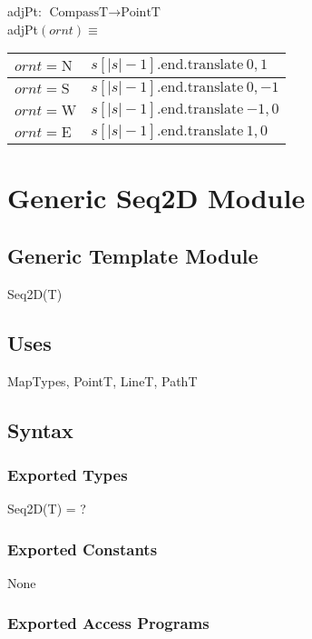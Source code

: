 \documentclass[12pt]{article}
\begin{document}
\noindent adjPt: $\mbox{CompassT} \rightarrow \mbox{PointT}$\\
adjPt$(ornt) \equiv$

\medskip

\begin{tabular}{|l|l|}
\hline
$ornt = \mbox{N}$ & $s[|s|-1].\mbox{end}.\mbox{translate}\ {0, 1}$\\
\hline
$ornt = \mbox{S}$ & $s[|s|-1].\mbox{end}.\mbox{translate}\ {0, -1}$\\
\hline
$ornt = \mbox{W}$ & $s[|s|-1].\mbox{end}.\mbox{translate}\ {-1, 0}$\\
\hline
$ornt = \mbox{E}$ & $s[|s|-1].\mbox{end}.\mbox{translate}\ {1, 0}$\\
\hline
\end{tabular}

\newpage

\section* {Generic Seq2D Module}

\subsection* {Generic Template Module}

Seq2D(T)

\subsection* {Uses}

MapTypes, PointT, LineT, PathT

\subsection* {Syntax}

\subsubsection* {Exported Types}

Seq2D(T) = ?

\subsubsection* {Exported Constants}

None

\subsubsection* {Exported Access Programs}
\end{document}
